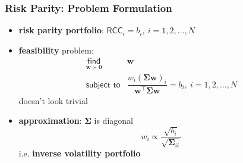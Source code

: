 \documentclass{beamer}
\begin{document}

        \begin{frame}
          \frametitle{Risk Parity: Problem Formulation}
          \vspace{.5cm}
            \begin{itemize}
              \item \textbf{risk parity portfolio}: $\textsf{RCC}_i = b_i,~i=1,2,\dots,N$
              \item \textbf{feasibility} problem:
            \begin{equation*}
            \begin{array}{ll}
              \underset{\bm{w} \succ \mathbf{0}}{\textsf{find}} & \bm{w} \\
              \textsf{subject to} &
              \dfrac{w_i\left(\boldsymbol{\Sigma\bm{w}}\right)_i}{\bm{w}^\top\boldsymbol{\Sigma}\bm{w}} =
              b_i,~ i = 1, 2, \dots, N
            \end{array}
            \end{equation*}
            doesn't look trivial
          \item \textbf{approximation}: $\boldsymbol{\Sigma}$ is diagonal
            \begin{equation*}
              w_i \propto \dfrac{\sqrt{b_i}}{\sqrt{\boldsymbol{\Sigma}_{ii}}}
            \end{equation*}
          i.e. \textbf{inverse volatility portfolio}
            \end{itemize}
        \end{frame}
\end{document}
